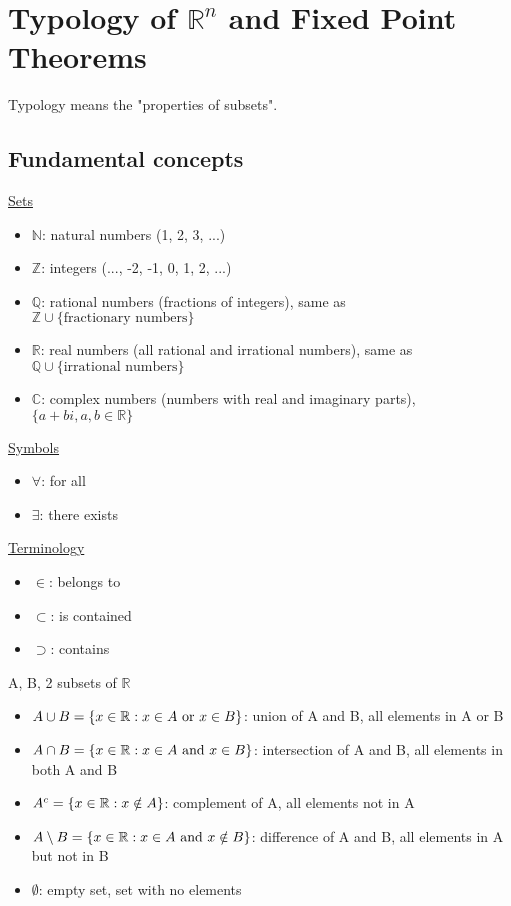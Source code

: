 \chapter{Typology of ${\mathbb{R}}^n$ and Fixed Point Theorems}
Typology means the "properties of subsets".

\section{Fundamental concepts}

\underline{Sets}
\begin{itemize}
    \item $\mathbb{N}$: natural numbers (1, 2, 3, ...)
    \item $\mathbb{Z}$: integers (..., -2, -1, 0, 1, 2, ...)
    \item $\mathbb{Q}$: rational numbers (fractions of integers), same as $\mathbb{Z}\cup\{\text{fractionary numbers}\}$
    \item $\mathbb{R}$: real numbers (all rational and irrational numbers), same as $\mathbb{Q}\cup\{\text{irrational numbers}\}$
    \item $\mathbb{C}$: complex numbers (numbers with real and imaginary parts), $\{a+bi, a, b\in\mathbb{R}\}$
\end{itemize}

\noindent
\underline{Symbols}
\begin{itemize}
    \item $\forall$: for all
    \item $\exists$: there exists
\end{itemize}

\noindent
\underline{Terminology}
\begin{itemize}
    \item $\in$: belongs to
    \item $\subset$: is contained
    \item $\supset$: contains
\end{itemize}

\noindent
A, B, 2 subsets of $\mathbb{R}$
\begin{itemize}
    \item $A\cup B = \{x\in\mathbb{R}:x\in A\text{ or }x\in B\}$: union of A and B, all elements in A or B
    \item $A\cap B = \{x\in\mathbb{R}:x\in A\text{ and }x\in B\}$: intersection of A and B, all elements in both A and B
    \item $A^c = \{x\in\mathbb{R}:x\notin A\}$: complement of A, all elements not in A
    \item $A\setminus B = \{x\in\mathbb{R}:x\in A\text{ and }x\notin B\}$: difference of A and B, all elements in A but not in B
    \item $\emptyset$: empty set, set with no elements
\end{itemize}

